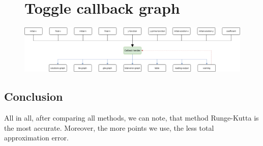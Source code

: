 \documentclass[12pt,letterpaper]{article}
\begin{document}
\begin{figure}[!h]
    \begin{center}
        \section*{Toggle callback graph}
    \end{center}
    \centering
        \includegraphics[width=1\linewidth]{callback.png}
\end{figure}

\clearpage
\begin{center}
    \section*{Conclusion}
\end{center}
All in all, after comparing all methods, we can note, that method Runge-Kutta is the most accurate. Moreover, the more points we use, the less total approximation error.
\end{document}
